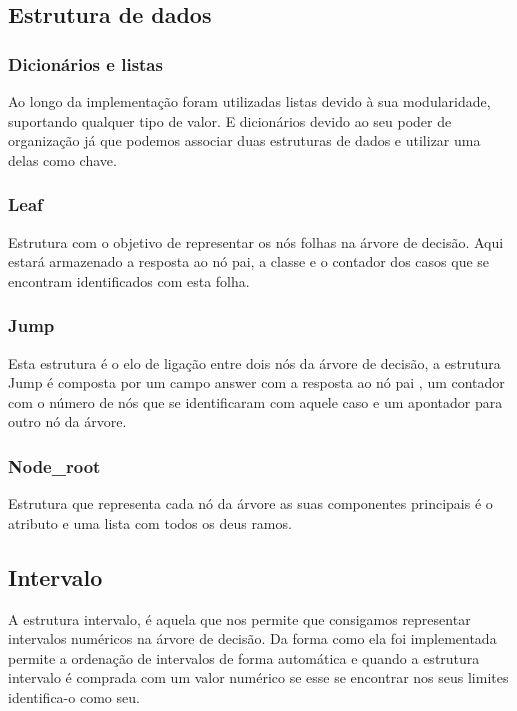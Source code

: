 \documentclass[12pt,a4paper]{article}
\begin{document}
\subsection{Estrutura de dados}

\subsubsection{Dicionários e listas}
Ao longo da implementação foram utilizadas listas devido à sua modularidade, suportando qualquer tipo de valor. E dicionários devido ao seu poder de organização já que podemos associar duas estruturas de dados e utilizar uma delas como chave.

\subsubsection{Leaf}
Estrutura com o objetivo de representar os nós folhas na árvore de decisão. Aqui estará armazenado a resposta ao nó pai, a classe e o contador dos casos que se encontram identificados com esta folha.
\subsubsection{Jump}
Esta estrutura é o elo de ligação entre dois nós da árvore  de decisão, a estrutura Jump é composta por um campo answer com a resposta ao nó pai , um contador com o número de nós que se identificaram com aquele caso e um apontador para outro nó da árvore.
\subsubsection{Node\_root}
Estrutura que representa cada nó da árvore as suas componentes principais é o atributo e uma lista com todos os deus ramos.

\subsection{Intervalo}
A estrutura intervalo, é aquela que nos permite que consigamos representar intervalos numéricos na árvore de decisão. Da forma como ela foi implementada permite a ordenação de intervalos de forma automática e quando a estrutura intervalo é comprada com um valor numérico se esse se encontrar nos seus limites identifica-o como seu.
\end{document}
